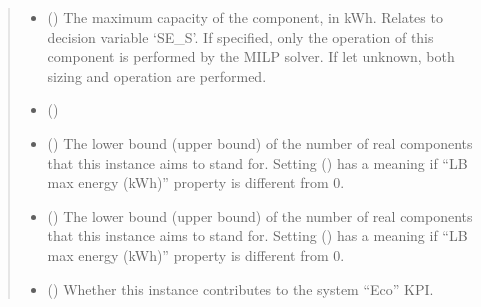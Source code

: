 \documentclass[letterpaper,10pt,english]{sphinxmanual}
\begin{document}
\begin{fulllineitems}
\begin{fulllineitems}
\begin{quote}
\begin{description}
\begin{itemize}
\item {} 
\sphinxAtStartPar
{} (\sphinxstyleliteralemphasis{\sphinxupquote{, }}) \textendash{} The maximum capacity of the component, in kWh.
Relates to decision variable ‘SE\_S’.
If specified, only the operation of this component is performed by the MILP solver.
If let unknown, both sizing and operation are performed.

\item {} 
\sphinxAtStartPar
{} (\sphinxstyleliteralemphasis{\sphinxupquote{, }}) \textendash{} 

\item {} 
\sphinxAtStartPar
{} (\sphinxstyleliteralemphasis{\sphinxupquote{, }}\sphinxstyleliteralemphasis{\sphinxupquote{, }}) \textendash{} The lower bound (upper bound) of the number of real components that this instance aims to stand for.
Setting  () has a meaning if “LB max energy (kWh)” property is
different from 0.

\item {} 
\sphinxAtStartPar
{} (\sphinxstyleliteralemphasis{\sphinxupquote{, }}\sphinxstyleliteralemphasis{\sphinxupquote{, }}) \textendash{} The lower bound (upper bound) of the number of real components that this instance aims to stand for.
Setting  () has a meaning if “LB max energy (kWh)” property is
different from 0.

\item {} 
\sphinxAtStartPar
{} (\sphinxstyleliteralemphasis{\sphinxupquote{, }}\sphinxstyleliteralemphasis{\sphinxupquote{, }}) \textendash{} Whether this instance contributes to the system “Eco” KPI.


\end{itemize}
\end{description}
\end{quote}
\end{fulllineitems}
\end{fulllineitems}
\end{document}
